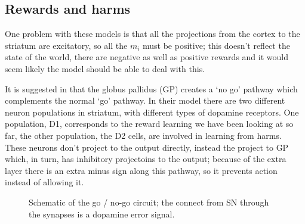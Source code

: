 \documentclass[11pt,a4paper]{scrartcl}
\begin{document}
\subsection*{Rewards and harms}
One problem with these models is that all the projections from the
cortex to the striatum are excitatory, so all the $m_i$ must be
positive; this doesn't reflect the state of the world, there are
negative as well as positive rewards and it would seem likely the
model should be able to deal with this.

It is suggested in \cite{FrankEtAl2004a} that the globus pallidus (GP)
creates a \lq{}no go\rq{} pathway which complements the normal
\lq{}go\rq{} pathway. In their model there are two different neuron
populations in striatum, with different types of dopamine
receptors. One population, D1, corresponds to the reward learning we
have been looking at so far, the other population, the D2 cells, are
involved in learning from harms. These neurons don't project to the
output directly, instead the project to GP which, in turn, has
inhibitory projectoins to the output; because of the extra layer there
is an extra minus sign along this pathway, so it prevents action
instead of allowing it.

\begin{figure}
\begin{center}
\end{center}
\caption{Schematic of the go / no-go circuit; the connect from SN through the synapses is a dopamine error signal.\label{fig:gng}}
\end{figure}
\end{document}
